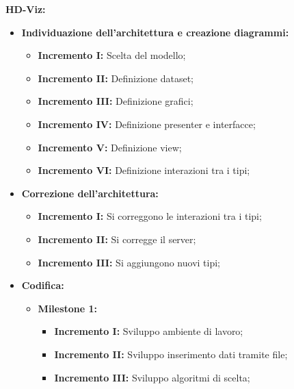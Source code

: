 \documentclass[../piano_di_progetto.tex]{subfiles}
\begin{document}
\textbf{HD-Viz:}
\begin{itemize}
    \item \textbf{Individuazione dell'architettura e creazione diagrammi:}
    \begin{itemize}
        \item \textbf{Incremento I:} Scelta del modello;
        \item \textbf{Incremento II:} Definizione dataset;
        \item \textbf{Incremento III:} Definizione grafici;
        \item \textbf{Incremento IV:} Definizione presenter e interfacce;
        \item \textbf{Incremento V:} Definizione view;
        \item \textbf{Incremento VI:} Definizione interazioni tra i tipi;      
    \end{itemize}

    \item \textbf{Correzione dell'architettura:}
    \begin{itemize}
        \item \textbf{Incremento I:} Si correggono le interazioni tra i tipi;
        \item \textbf{Incremento II:} Si corregge il server;
        \item \textbf{Incremento III:} Si aggiungono nuovi tipi;
    \end{itemize}

    \item \textbf{Codifica:}
    \begin{itemize}
    \item \textbf{Milestone 1:}
        \begin{itemize}
            \item \textbf{Incremento I:} Sviluppo ambiente di lavoro;
            \item \textbf{Incremento II:} Sviluppo inserimento dati tramite file;
            \item \textbf{Incremento III:} Sviluppo algoritmi di scelta;
    \end{itemize}


\end{itemize}
\end{itemize}
\end{document}
